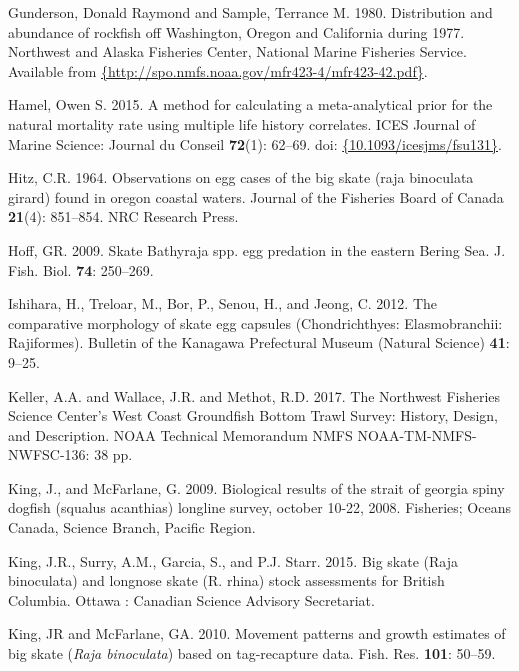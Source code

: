 \documentclass[12pt,]{article}
\begin{document}
\leavevmode\hypertarget{ref-Gunderson1980}{}%
Gunderson, Donald Raymond and Sample, Terrance M. 1980. Distribution and
abundance of rockfish off Washington, Oregon and California during 1977.
Northwest and Alaska Fisheries Center, National Marine Fisheries
Service. Available from
\href{\%7Bhttp://spo.nmfs.noaa.gov/mfr423-4/mfr423-42.pdf\%7D}{\{http://spo.nmfs.noaa.gov/mfr423-4/mfr423-42.pdf\}}.

\leavevmode\hypertarget{ref-Hamel2015}{}%
Hamel, Owen S. 2015. A method for calculating a meta-analytical prior
for the natural mortality rate using multiple life history correlates.
ICES Journal of Marine Science: Journal du Conseil \textbf{72}(1):
62--69. doi:
\href{https://doi.org/\%7B10.1093/icesjms/fsu131\%7D}{\{10.1093/icesjms/fsu131\}}.

\leavevmode\hypertarget{ref-Hitz1964}{}%
Hitz, C.R. 1964. Observations on egg cases of the big skate (raja
binoculata girard) found in oregon coastal waters. Journal of the
Fisheries Board of Canada \textbf{21}(4): 851--854. NRC Research Press.

\leavevmode\hypertarget{ref-Hoff2009}{}%
Hoff, GR. 2009. Skate Bathyraja spp. egg predation in the eastern Bering
Sea. J. Fish. Biol. \textbf{74}: 250--269.

\leavevmode\hypertarget{ref-Ishihara2012}{}%
Ishihara, H., Treloar, M., Bor, P., Senou, H., and Jeong, C. 2012. The
comparative morphology of skate egg capsules (Chondrichthyes:
Elasmobranchii: Rajiformes). Bulletin of the Kanagawa Prefectural Museum
(Natural Science) \textbf{41}: 9--25.

\leavevmode\hypertarget{ref-Keller2017}{}%
Keller, A.A. and Wallace, J.R. and Methot, R.D. 2017. The Northwest
Fisheries Science Center's West Coast Groundfish Bottom Trawl Survey:
History, Design, and Description. NOAA Technical Memorandum NMFS
NOAA-TM-NMFS-NWFSC-136: 38 pp.

\leavevmode\hypertarget{ref-KingandMcF2009}{}%
King, J., and McFarlane, G. 2009. Biological results of the strait of
georgia spiny dogfish (squalus acanthias) longline survey, october
10-22, 2008. Fisheries; Oceans Canada, Science Branch, Pacific Region.

\leavevmode\hypertarget{ref-King2015}{}%
King, J.R., Surry, A.M., Garcia, S., and P.J. Starr. 2015. Big skate
(Raja binoculata) and longnose skate (R. rhina) stock assessments for
British Columbia. Ottawa : Canadian Science Advisory Secretariat.

\leavevmode\hypertarget{ref-KingandMcF2010}{}%
King, JR and McFarlane, GA. 2010. Movement patterns and growth estimates
of big skate (\emph{Raja binoculata}) based on tag-recapture data. Fish.
Res. \textbf{101}: 50--59.
\end{document}
